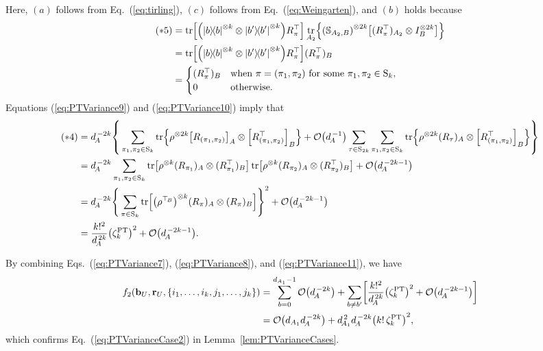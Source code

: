 \documentclass[aps,prl,twocolumn,nofootinbib,superscriptaddress,10pt]{revtex4-2}
\let\originalleft\left
\let\originalright\right
\renewcommand{\left}{\mathopen{}\mathclose\bgroup\originalleft}
\renewcommand{\right}{\aftergroup\egroup\originalright}
\newcommand{\ketbra}[2]{\ensuremath{\left|#1\right\rangle\!\left\langle#2\right|}}
\DeclareMathOperator{\Tr}{tr}
\newcommand{\bigo}[1]{\mathcal{O}\left(#1\right)}
\theoremstyle{plain}
\theoremstyle{definition}
\newcommand{\PT}{\mathrm{PT}}
\def\eqref#1{\textup{(\ref{#1})}}
\newcommand{\eref}[1]{Eq.~\textup{(\ref{#1})}}
\newcommand{\lref}[1]{Lemma~\ref{#1}}
\begin{document}
Here, $(a)$ follows from \eref{eq:tirling}, $(c)$ follows from \eref{eq:Weingarten}, and $(b)$ holds because 
\begin{align}
(*5)
&= \Tr \left[\left(\ketbra{b}{b}^{\otimes k}\otimes\ketbra{b'}{b'}^{\otimes k} \right) R_{\pi}^{\top}\right] 
\Tr_{A_2} \left\lbrace \left( \mathbb{S}_{A_2,B} \right)^{\otimes 2k}  \left[(R_{\pi}^{\top})_{A_2} \otimes I_B^{\otimes 2k} \right] \right\rbrace 
\nonumber\\
&= \Tr \left[\left(\ketbra{b}{b}^{\otimes k}\otimes\ketbra{b'}{b'}^{\otimes k} \right) R_{\pi}^{\top}\right]  (R_{\pi}^{\top})_{B}
\nonumber\\
&=
\begin{cases}
 (R_{\pi}^{\top})_{B} & \text{when } \pi=(\pi_1,\pi_2) \text{ for some } \pi_1,\pi_2\in\mathrm{S}_{k}, \\
0   &  \text{otherwise}.   
\end{cases}
\end{align}
Equations \eqref{eq:PTVariance9} and \eqref{eq:PTVariance10} imply that
\begin{align}\label{eq:PTVariance11} 
(*4)&= 
d_{\!A}^{\,-2k} \left\lbrace \,\sum_{\pi_1,\pi_2\in \mathrm{S}_{k}} 
\Tr \left\{ \rho^{\otimes 2k} \left[R_{(\pi_1,\pi_2)}\right]_A \otimes \left[ R_{(\pi_1,\pi_2)}^\top\right]_B \right\} 
+ \bigo{d_{\!A}^{\,-1}} \sum_{\tau \in \mathrm{S}_{2k}} \sum_{\pi_1,\pi_2 \in \mathrm{S}_{k}}  
\Tr \left\{ \rho^{\otimes 2k} (R_\tau)_{A} \otimes \left[ R_{(\pi_1,\pi_2)}^\top\right]_B \right\} \right\rbrace 
\nonumber\\
&=d_{\!A}^{\,-2k} \sum_{\pi_1,\pi_2\in \mathrm{S}_{k}} 
\Tr \left[  \rho^{\otimes k} (R_{\pi_1})_A \otimes (R_{\pi_1}^\top)_B \right] 
\Tr \left[  \rho^{\otimes k} (R_{\pi_2})_A \otimes (R_{\pi_2}^\top)_B \right] 
+ \bigo{d_{\!A}^{\,-2k-1}} 
\nonumber\\
&=d_{\!A}^{\,-2k} \left\lbrace \,\sum_{\pi\in \mathrm{S}_{k}} 
\Tr \left[  \left( \rho^{\top_{\!B}}\right) ^{\otimes k} (R_{\pi})_A \otimes (R_{\pi})_B \right] \right\rbrace^2 
+ \bigo{d_{\!A}^{\,-2k-1}} 
\nonumber\\
&= \frac{k!^2}{d_{\!A}^{\,2k}} \left( \zeta_k^{\PT}\right)^2+ \bigo{d_{\!A}^{\,-2k-1}}. 
\end{align}


By combining Eqs.~\eqref{eq:PTVariance7}, \eqref{eq:PTVariance8}, and \eqref{eq:PTVariance11}, we have 
\begin{align}\label{eq:PTVariance12} 
f_2\left( \mathbf{b}_{U},\mathbf{r}_{U},\left\lbrace i_1,\dots,i_k,j_1,\dots,j_k\right\rbrace \right)
&= \sum_{b=0}^{d_{A_1}-1}\bigo{d_{\!A}^{\,-2k}} + \sum_{b\ne b'}\left[\frac{k!^2}{d_{\!A}^{\,2k}} \left( \zeta_k^{\PT}\right) ^2+ \bigo{d_{\!A}^{\,-2k-1}} \right] 
\nonumber\\
&=\bigo{d_{A_1} d_{\!A}^{\,-2k}}+ d_{\!A_1}^{\,2} d_{\!A}^{\,-2k} \left( k!\,\zeta_k^{\PT}\right)^2,
\end{align}
which confirms \eref{eq:PTVarianceCase2} in \lref{lem:PTVarianceCases}.
\end{document}
